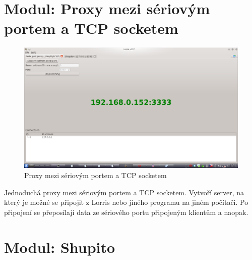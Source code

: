 \documentclass[12pt, a4paper, oneside]{article}
\begin{document}
\newpage
\setlength{\voffset}{0mm} %
\pagestyle{plain}

\section{Modul: Proxy mezi sériovým portem a TCP socketem}

\begin{figure}[H]
\begin{center}
\includegraphics[width=\textwidth]{img/proxy.png}
\caption{Proxy mezi sériovým portem a TCP socketem}
\label{Shupito}
\end{center}
\end{figure}
Jednoduchá proxy mezi sériovým portem a TCP socketem. Vytvoří server, na který je možné se připojit z Lorris nebo jiného programu na jiném počítači. Po připojení se přeposílají data ze sériového portu připojeným klientům a naopak.

\newpage
\setlength{\voffset}{0mm} %
\pagestyle{plain}

\section{Modul: Shupito}
\end{document}
